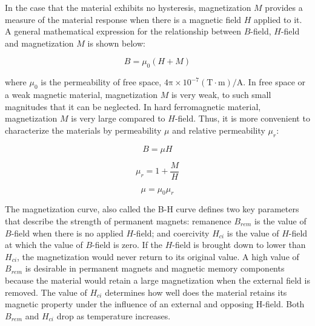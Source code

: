         
        In the case that the material exhibits no hysteresis, magnetization $M$ provides a measure of the material response when there is a magnetic field $H$ applied to it. A general mathematical expression for the relationship between $B$-field, $H$-field and magnetization $M$ is shown below:
    
    
        \begin{equation}
            B = \mu_0 (H + M)
            \label{eq:magnetic field, field density and magnetization}
        \end{equation}    
    
    
        where $\mu_0$ is the permeability of free space, $\mathrm{4\pi \times 10^{-7} (T\cdot m)/A}$. In free space or a weak magnetic material, magnetization $M$ is very weak, to such small magnitudes that it can be neglected. In hard ferromagnetic material, magnetization $M$ is very large compared to $H$-field. Thus, it is more convenient to characterize the materials by permeability $\mu$ and relative permeability $\mu_r$:
    
    
        \begin{equation}
            B = \mu H
            \label{eq:magnetic field and magnetic field density}
        \end{equation}   
        
        \begin{equation}
            \mu_r = 1 + \frac{M}{H} 
            \label{eq:realtive permeability definition}
        \end{equation}   
        
        \begin{equation}
            \mu = \mu_0 \mu_r 
            \label{eq:permeability definition}
        \end{equation}  
    
    
        The magnetization curve, also called the B-H curve defines two key parameters that describe the strength of permanent magnets: remanence $B_{rem}$ is the value of $B$-field when there is no applied $H$-field; and coercivity $H_{ci}$ is the value of $H$-field at which the value of $B$-field is zero. If the $H$-field is brought down to lower than $H_{ci}$, the magnetization would never return to its original value. A high value of $B_{rem}$ is desirable in permanent magnets and magnetic memory components because the material would retain a large magnetization when the external field is removed. The value of $H_{ci}$ determines how well does the material retains its magnetic property under the influence of an external and opposing H-field. Both $B_{rem}$ and $H_{ci}$ drop as temperature increases.
        
